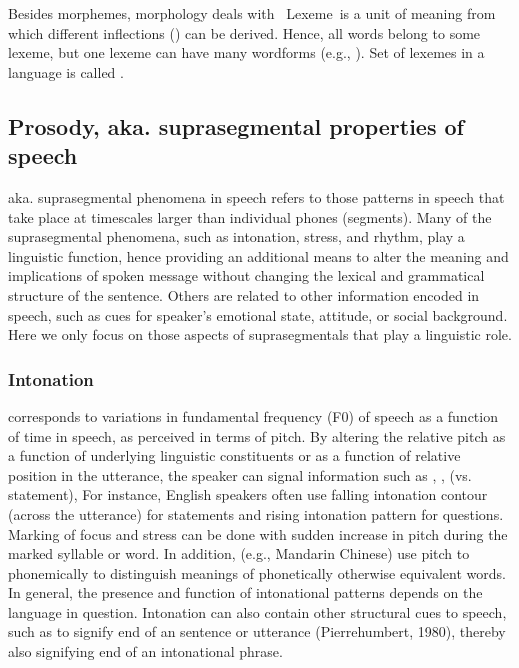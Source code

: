 \documentclass[letterpaper,10pt,english]{jupyterBook}
\begin{document}
\sphinxAtStartPar
Besides morphemes, morphology deals with  Lexeme is a unit of
meaning from which different inflections () can be derived.
Hence, all words belong to some lexeme, but one lexeme can have many
word\sphinxhyphen{}forms (e.g., ). Set of lexemes in a language
is called .


\subsection{Prosody, aka. suprasegmental properties of speech}
\label{\detokenize{Introduction/Linguistic_structure_of_speech:prosody-aka-suprasegmental-properties-of-speech}}
\sphinxAtStartPar
{} aka.
suprasegmental phenomena in speech refers to those patterns in speech
that take place at time\sphinxhyphen{}scales larger than individual phones (segments).
Many of the suprasegmental phenomena, such as intonation, stress, and
rhythm, play a linguistic function, hence providing an additional means
to alter the meaning and implications of spoken message without changing
the lexical and grammatical structure of the sentence. Others are
related to other information encoded in speech, such as cues for
speaker’s emotional state, attitude, or social background. Here we only
focus on those aspects of suprasegmentals that play a linguistic role.


\subsubsection{Intonation}
\label{\detokenize{Introduction/Linguistic_structure_of_speech:intonation}}
\sphinxAtStartPar
{} corresponds to variations in fundamental frequency (F0) of
speech as a function of time in speech, as perceived in terms of pitch.
By altering the relative pitch as a function of underlying linguistic
constituents or as a function of relative position in the utterance, the
speaker can signal information such as , ,
 (vs. statement),  For instance, English speakers
often use falling intonation contour (across the utterance) for
statements and rising intonation pattern for questions. Marking of focus
and stress can be done with sudden increase in pitch during the marked
syllable or word. In addition,  (e.g., Mandarin Chinese)
use pitch to phonemically to distinguish meanings of phonetically
otherwise equivalent words. In general, the presence and function of
intonational patterns depends on the language in question. Intonation
can also contain other structural cues to speech, such as  to signify end of
an sentence or utterance (Pierrehumbert, 1980), thereby also signifying
end of an intonational phrase.
\end{document}
